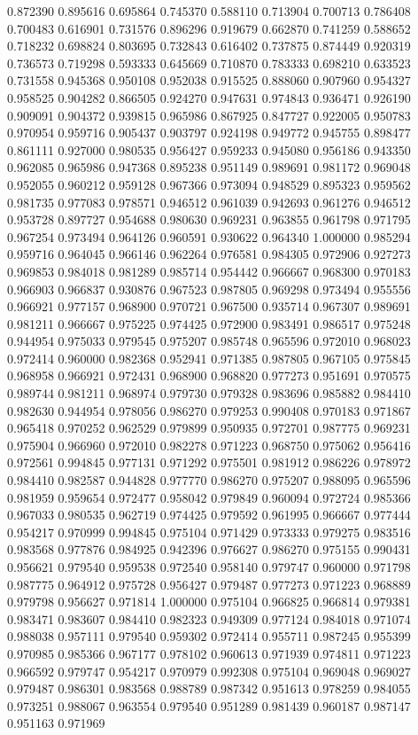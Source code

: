 0.872390
0.895616
0.695864
0.745370
0.588110
0.713904
0.700713
0.786408
0.700483
0.616901
0.731576
0.896296
0.919679
0.662870
0.741259
0.588652
0.718232
0.698824
0.803695
0.732843
0.616402
0.737875
0.874449
0.920319
0.736573
0.719298
0.593333
0.645669
0.710870
0.783333
0.698210
0.633523
0.731558
0.945368
0.950108
0.952038
0.915525
0.888060
0.907960
0.954327
0.958525
0.904282
0.866505
0.924270
0.947631
0.974843
0.936471
0.926190
0.909091
0.904372
0.939815
0.965986
0.867925
0.847727
0.922005
0.950783
0.970954
0.959716
0.905437
0.903797
0.924198
0.949772
0.945755
0.898477
0.861111
0.927000
0.980535
0.956427
0.959233
0.945080
0.956186
0.943350
0.962085
0.965986
0.947368
0.895238
0.951149
0.989691
0.981172
0.969048
0.952055
0.960212
0.959128
0.967366
0.973094
0.948529
0.895323
0.959562
0.981735
0.977083
0.978571
0.946512
0.961039
0.942693
0.961276
0.946512
0.953728
0.897727
0.954688
0.980630
0.969231
0.963855
0.961798
0.971795
0.967254
0.973494
0.964126
0.960591
0.930622
0.964340
1.000000
0.985294
0.959716
0.964045
0.966146
0.962264
0.976581
0.984305
0.972906
0.927273
0.969853
0.984018
0.981289
0.985714
0.954442
0.966667
0.968300
0.970183
0.966903
0.966837
0.930876
0.967523
0.987805
0.969298
0.973494
0.955556
0.966921
0.977157
0.968900
0.970721
0.967500
0.935714
0.967307
0.989691
0.981211
0.966667
0.975225
0.974425
0.972900
0.983491
0.986517
0.975248
0.944954
0.975033
0.979545
0.975207
0.985748
0.965596
0.972010
0.968023
0.972414
0.960000
0.982368
0.952941
0.971385
0.987805
0.967105
0.975845
0.968958
0.966921
0.972431
0.968900
0.968820
0.977273
0.951691
0.970575
0.989744
0.981211
0.968974
0.979730
0.979328
0.983696
0.985882
0.984410
0.982630
0.944954
0.978056
0.986270
0.979253
0.990408
0.970183
0.971867
0.965418
0.970252
0.962529
0.979899
0.950935
0.972701
0.987775
0.969231
0.975904
0.966960
0.972010
0.982278
0.971223
0.968750
0.975062
0.956416
0.972561
0.994845
0.977131
0.971292
0.975501
0.981912
0.986226
0.978972
0.984410
0.982587
0.944828
0.977770
0.986270
0.975207
0.988095
0.965596
0.981959
0.959654
0.972477
0.958042
0.979849
0.960094
0.972724
0.985366
0.967033
0.980535
0.962719
0.974425
0.979592
0.961995
0.966667
0.977444
0.954217
0.970999
0.994845
0.975104
0.971429
0.973333
0.979275
0.983516
0.983568
0.977876
0.984925
0.942396
0.976627
0.986270
0.975155
0.990431
0.956621
0.979540
0.959538
0.972540
0.958140
0.979747
0.960000
0.971798
0.987775
0.964912
0.975728
0.956427
0.979487
0.977273
0.971223
0.968889
0.979798
0.956627
0.971814
1.000000
0.975104
0.966825
0.966814
0.979381
0.983471
0.983607
0.984410
0.982323
0.949309
0.977124
0.984018
0.971074
0.988038
0.957111
0.979540
0.959302
0.972414
0.955711
0.987245
0.955399
0.970985
0.985366
0.967177
0.978102
0.960613
0.971939
0.974811
0.971223
0.966592
0.979747
0.954217
0.970979
0.992308
0.975104
0.969048
0.969027
0.979487
0.986301
0.983568
0.988789
0.987342
0.951613
0.978259
0.984055
0.973251
0.988067
0.963554
0.979540
0.951289
0.981439
0.960187
0.987147
0.951163
0.971969
